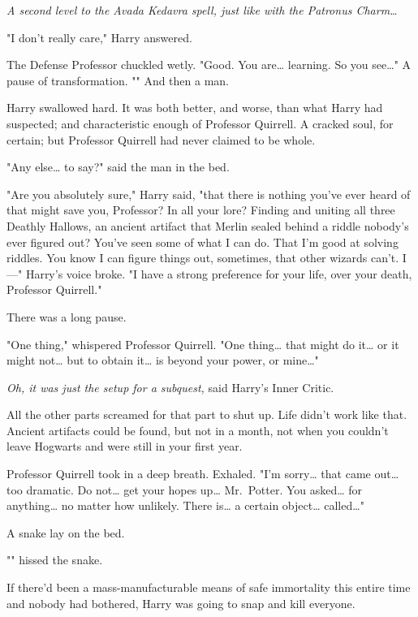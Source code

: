 \emph{A second level to the Avada Kedavra spell, just like with the Patronus
Charm{\ldots}}

"I don't really care," Harry answered.

The Defense Professor chuckled wetly. "Good. You are{\ldots} learning. So you
see{\ldots}" A pause of transformation. "" And then a man.

Harry swallowed hard. It was both better, and worse, than what Harry had
suspected; and characteristic enough of Professor Quirrell. A cracked soul, for
certain; but Professor Quirrell had never claimed to be whole.

"Any else{\ldots} to say?" said the man in the bed.

"Are you absolutely sure," Harry said, "that there is nothing you've ever heard
of that might save you, Professor? In all your lore? Finding and uniting all
three Deathly Hallows, an ancient artifact that Merlin sealed behind a riddle
nobody's ever figured out? You've seen some of what I can do. That I'm good at
solving riddles. You know I can figure things out, sometimes, that other
wizards can't. I---" Harry's voice broke. "I have a strong preference for your
life, over your death, Professor Quirrell."

There was a long pause.

"One thing," whispered Professor Quirrell. "One thing{\ldots} that might do
it{\ldots} or it might not{\ldots} but to obtain it{\ldots} is beyond your
power, or mine{\ldots}"

\emph{Oh, it was just the setup for a subquest,} said Harry's Inner Critic.

All the other parts screamed for that part to shut up. Life didn't work like
that. Ancient artifacts could be found, but not in a month, not when you
couldn't leave Hogwarts and were still in your first year.

Professor Quirrell took in a deep breath. Exhaled. "I'm sorry{\ldots} that came
out{\ldots} too dramatic. Do not{\ldots} get your hopes up{\ldots} Mr.~Potter.
You asked{\ldots} for anything{\ldots} no matter how unlikely. There is{\ldots}
a certain object{\ldots} called{\ldots}"

A snake lay on the bed.

"" hissed the snake.

If there'd been a mass-manufacturable means of safe immortality this entire
time and nobody had bothered, Harry was going to snap and kill everyone.


